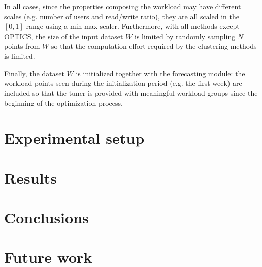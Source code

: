 \documentclass[a4paper]{article} %
\begin{document}
	In all cases, since the properties composing the workload may have different scales (e.g. number of users and read/write ratio), they are all scaled in the $[0, 1]$ range using a min-max scaler.	Furthermore, with all methods except OPTICS, the size of the input dataset $W$ is limited by randomly sampling $N$ points from $W$ so that the computation effort required by the clustering methods is limited.	
	
	Finally, the dataset $W$ is initialized together with the forecasting module: the workload points seen during the initialization period (e.g. the first week) are included so that the tuner is provided with meaningful workload groups since the beginning of the optimization process.

	\section{ Experimental setup }
	
	\section{ Results }
	
	\section{ Conclusions }
	
	\section{ Future work }
		
	
	\newpage
	 
	
	
	
\end{document}
